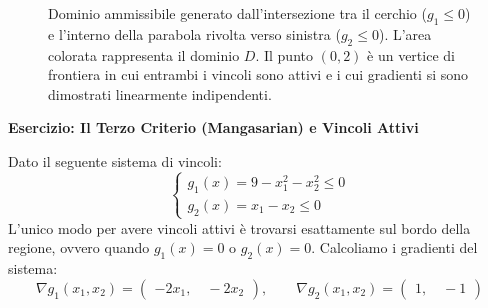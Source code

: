 \documentclass[12pt, a4paper]{article}
\newcommand{\separatore}{\noindent{\color{titlecolor!50}\rule{\textwidth}{0.6pt}}}
\begin{document}
	\begin{figure}[H]
		\centering
		\caption{Dominio ammissibile generato dall'intersezione tra il cerchio ($g_1 \le 0$) e l'interno della parabola rivolta verso sinistra ($g_2 \le 0$). L'area colorata rappresenta il dominio $D$. Il punto $(0,2)$ è un vertice di frontiera in cui entrambi i vincoli sono attivi e i cui gradienti si sono dimostrati linearmente indipendenti.}
	\end{figure}
	
	\vspace{0.6cm}
	\separatore
	\vspace{0.4cm}
	
	\textbf{Esercizio: Il Terzo Criterio (Mangasarian) e Vincoli Attivi}
	
	Dato il seguente sistema di vincoli:
	\[
	\begin{cases}
		g_1(x) = 9 - x_1^2 - x_2^2 \le 0 \\
		g_2(x) = x_1 - x_2 \le 0
	\end{cases}
	\]
	L'unico modo per avere vincoli attivi è trovarsi esattamente sul bordo della regione, ovvero quando $g_1(x) = 0$ o $g_2(x) = 0$. Calcoliamo i gradienti del sistema:
	\[
	\nabla g_1(x_1, x_2) = \begin{pmatrix} -2x_1, \quad -2x_2 \end{pmatrix}, \qquad \nabla g_2(x_1, x_2) = \begin{pmatrix} 1, \quad -1 \end{pmatrix}
	\]
	
\end{document}
